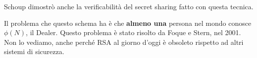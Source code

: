 \begin{remark}
Schoup dimostrò anche la verificabilità del secret sharing fatto con questa tecnica.
\end{remark}
\begin{remark}
Il problema che questo schema ha è che \textbf{almeno una} persona nel mondo conosce $\phi(N)$, il Dealer. Questo problema è stato risolto da Foque e Stern, nel 2001. Non lo vediamo, anche perché RSA al giorno d'oggi è obsoleto rispetto ad altri sistemi di sicurezza.
\end{remark}
